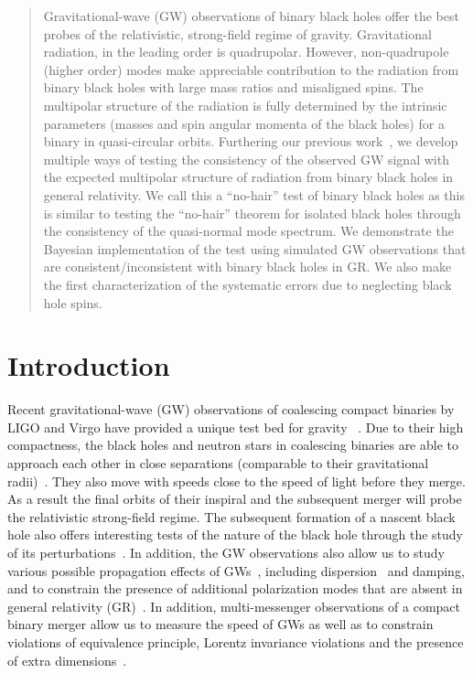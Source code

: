 \documentclass[prd,preprintnumbers,twocolumn,eqsecnum,floatfix,a4paper,nofootinbib,superscriptaddress]{revtex4}
\begin{document}
\begin{abstract}
Gravitational-wave (GW) observations of binary black holes offer the best probes of the relativistic, strong-field regime of gravity. Gravitational radiation, in the leading order is quadrupolar. However, non-quadrupole (higher order) modes make appreciable contribution to the radiation from binary black holes with large mass ratios and misaligned spins. The multipolar structure of the radiation is fully determined by the intrinsic parameters (masses and spin angular momenta of the black holes) for a binary in quasi-circular orbits. Furthering our previous work~\cite{Dhanpal:2018ufk}, we develop multiple ways of testing the consistency of the observed GW signal with the expected multipolar structure of radiation from binary black holes in general relativity. We call this a ``no-hair'' test of binary black holes as this is similar to testing the ``no-hair'' theorem for isolated black holes through the consistency of the quasi-normal mode spectrum. We demonstrate the Bayesian implementation of the test using simulated GW observations that are consistent/inconsistent with binary black holes in GR. We also make the first characterization of the systematic errors due to neglecting black hole spins. 
\end{abstract}
\preprint{}
\maketitle
\section{Introduction}

Recent gravitational-wave (GW) observations of coalescing compact binaries by LIGO and Virgo have provided a unique test bed for gravity ~\cite{LSC_2016grtests,gw170104,ligo2019tests,abbott2019tests,abbott2017gravitational}. Due to their high compactness, the black holes and neutron stars in coalescing binaries are able to approach each other in close separations (comparable to their gravitational radii)~\cite{GW150914}. They also move with speeds close to the speed of light before they merge. As a result the final orbits of their inspiral and the subsequent merger will probe the relativistic strong-field regime. The subsequent formation of a nascent black hole also offers interesting tests of the nature of the black hole through the study of its perturbations~\cite{Berti:2009kk}. In addition, the GW observations also allow us to study various possible propagation effects of GWs~\cite{samajdar2017projected}, including dispersion~\cite{Will:1997bb} and damping, and to constrain the presence of additional polarization modes that are absent in general relativity (GR)~\cite{isi2017probing}. In addition, multi-messenger observations of a compact binary merger allow us to measure the speed of GWs as well as to constrain violations of equivalence principle, Lorentz invariance violations and the presence of extra dimensions~\cite{abbott2019tests,abbott2017gravitational,Pardo:2018ipy}. 
\end{document}
